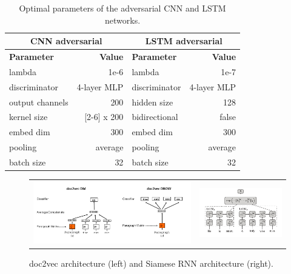 \documentclass{sigkddExp}
\begin{document}
\begin{table}[h]
    \begin{tabular}{l|r|l|r}
          \multicolumn{2}{c|}{\textbf{CNN adversarial}}
         & \multicolumn{2}{c}{\textbf{LSTM adversarial}}
         \\
         \toprule
         \textbf{Parameter}
         & \textbf{Value}
         & \textbf{Parameter}
         & \textbf{Value}
         \\
         \midrule
         lambda
         & 1e-6
         & lambda
         & 1e-7
         \\
         discriminator
         & 4-layer MLP
         & discriminator
         & 4-layer MLP
         \\
         output channels
         & 200
         & hidden size
         & 128
         \\
         kernel size
         & [2-6] x 200
         & bidirectional
         & false
         \\
         embed dim
         & 300
         & embed dim
         & 300
         \\
         pooling
         & average
         & pooling
         & average
         \\
         batch size
         & 32
         & batch size
         & 32
    \end{tabular}
    \caption{Optimal parameters of the adversarial CNN and LSTM networks.}
    \label{tab:param_adversarial}
\end{table}

\begin{figure}[h]
\begin{tabular}{cc}
    \includegraphics[width=\columnwidth]{img/doc2vec_architecture.png}
&   \includegraphics[width=0.7\columnwidth]{img/siamese_architecture.png}
\end{tabular}
\label{fig:part3_arch}
\caption{doc2vec architecture (left) and Siamese RNN architecture (right).}
\end{figure}
\end{document}
